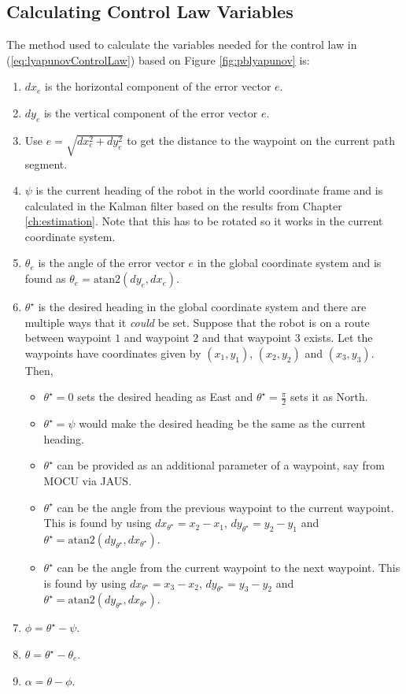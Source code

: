 \subsection{Calculating Control Law Variables}
\label{sec:lyapunovVariables}
The method used to calculate the variables needed for the control law in (\ref{eq:lyapunovControlLaw}) based on Figure \ref{fig:pblyapunov} is:
\begin{enumerate}
\item $dx_e$ is the horizontal component of the error vector $e$.
\item $dy_e$ is the vertical component of the error vector $e$.
\item Use $e = \sqrt{dx_e^2 + dy_e^2}$ to get the distance to the waypoint on the current path segment.
\item $\psi$ is the current heading of the robot in the world coordinate frame and is calculated in the Kalman filter based on the results from Chapter \ref{ch:estimation}. Note that this has to be rotated so it works in the current coordinate system.
\item $\theta_e$ is the angle of the error vector $e$ in the global coordinate system and is found as $\theta_e = \text{atan2}(dy_e,dx_e)$.
\item $\theta^\star$ is the desired heading in the global coordinate system and there are multiple ways that it \textit{could} be set. Suppose that the robot is on a route between waypoint $1$ and waypoint $2$ and that waypoint $3$ exists. Let the waypoints have coordinates given by $(x_1,y_1)$, $(x_2,y_2)$ and $(x_3,y_3)$. Then,
\begin{itemize}
\item $\theta^\star=0$ sets the desired heading as East and $\theta^\star=\frac{\pi}{2}$ sets it as North.
\item $\theta^\star=\psi$ would make the desired heading be the same as the current heading.
\item $\theta^\star$ can be provided as an additional parameter of a waypoint, say from MOCU via JAUS.
\item $\theta^\star$ can be the angle from the previous waypoint to the current waypoint. This is found by using $dx_{\theta^\star}=x_2-x_1$, $dy_{\theta^\star}=y_2-y_1$ and $\theta^\star=\text{atan2}(dy_{\theta^\star},dx_{\theta^\star})$.
\item $\theta^\star$ can be the angle from the current waypoint to the next waypoint. This is found by using $dx_{\theta^\star}=x_3-x_2$, $dy_{\theta^\star}=y_3-y_2$ and $\theta^\star=\text{atan2}(dy_{\theta^\star},dx_{\theta^\star})$.
\end{itemize}
\item $\phi=\theta^\star-\psi$.
\item $\theta=\theta^\star - \theta_e$.
\item $\alpha = \theta - \phi$.
\end{enumerate}

